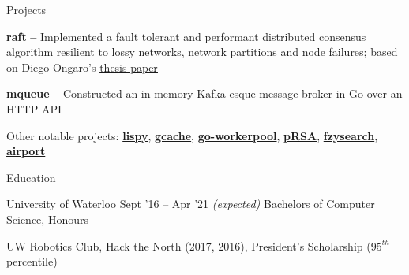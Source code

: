 \documentclass{resume} %
\begin{document}
\begin{rSection}{Projects}
  
  \begin{rProjectSection}
    \item \textbf {raft} {\textbf{--}} Implemented a fault tolerant and performant distributed
      consensus algorithm resilient to lossy networks, network partitions and
      node failures; based on Diego Ongaro's
      \href{https://raft.github.io/raft.pdf}{\underline{thesis paper}}
    \item \textbf {mqueue} {\textbf{--}} Constructed an in-memory Kafka-esque message broker in Go
      over an HTTP API
  \end{rProjectSection}

  \begin{rBlurbSection}
    \item {Other notable projects:}
      \href{https://github.com/ridwanmsharif/lispy}{\textbf{lispy}},
      \href{https://github.com/ridwanmsharif/cache}{\textbf{gcache}},
      \href{https://github.com/ridwanmsharif/goworkerpool}{\textbf{go-workerpool}},
      \href{https://github.com/ridwanmsharif/prsa}{\textbf{pRSA}},
      \href{https://github.com/ridwanmsharif/fzysearch}{\textbf{fzysearch}},
      \href{https://github.com/ridwanmsharif/airport}{\textbf{airport}}
  \end{rBlurbSection} 
 
\end{rSection}


\begin{rSection}{Education}
  \begin{rSubsection}{University of Waterloo}
		     {Sept '16 -- Apr '21 \em (expected)}
		     {Bachelors of Computer Science, Honours}
		     {}
    \item UW Robotics Club, Hack the North (2017, 2016), President's Scholarship
      ($95^{th}$ percentile)
  \end{rSubsection}
\end{rSection} 
\end{document}
